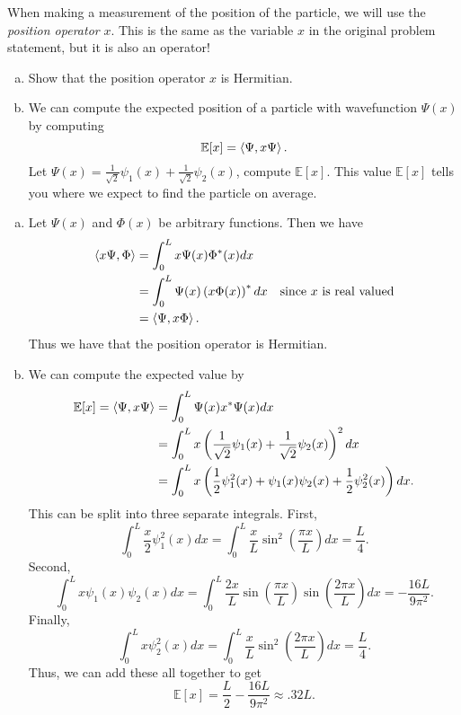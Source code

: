 \documentclass[12pt]{article} %
\begin{document}
\begin{problem}
  When making a measurement of the position of the particle, we will use the \emph{position operator} $x$.  This is the same as the variable $x$ in the original problem statement, but it is also an operator!
   \begin{enumerate}[(a)]
   		\item Show that the position operator $x$ is Hermitian.
   		\item We can compute the expected position of a particle with wavefunction $\Psi(x)$ by computing
   		\[
   		\mathbb{E}[x]=\left\langle \Psi, x\Psi \right\rangle.
   		\]
   		Let $\Psi(x) = \frac{1}{\sqrt{2}} \psi_1(x) + \frac{1}{\sqrt{2}} \psi_2(x)$, compute $\mathbb{E}[x]$. This value $\mathbb{E}[x]$ tells you where we expect to find the particle on average.
   	\end{enumerate}
\end{problem}
\begin{solution}
	\begin{enumerate}[(a)]
		\item Let $\Psi(x)$ and $\Phi(x)$ be arbitrary functions.  Then we have
		\begin{align*}
			\left\langle x\Psi, \Phi \right\rangle &= \int_0^L x \Psi(x)\Phi^*(x)dx\\
			&= \int_0^L \Psi(x) \left(x \Phi(x)\right)^*dx &\textrm{since $x$ is real valued}\\
			&= \left\langle \Psi, x\Phi \right\rangle.
		\end{align*}
		Thus we have that the position operator is Hermitian.
		\item We can compute the expected value by
		\begin{align*}
			\mathbb{E}[x] = \left\langle \Psi, x\Psi \right\rangle &= \int_0^L \Psi(x) x^* \Psi(x)dx\\
			&= \int_0^L x\left(\frac{1}{\sqrt{2}}\psi_1(x)+\frac{1}{\sqrt{2}} \psi_2(x)\right)^2dx\\
			&= \int_0^L x \left(\frac{1}{2} \psi_1^2(x) + \psi_1(x)\psi_2(x) + \frac{1}{2} \psi_2^2(x)\right)dx.
		\end{align*}
		This can be split into three separate integrals. First,
		\[
		\int_0^L \frac{x}{2} \psi_1^2(x)dx = \int_0^L \frac{x}{L} \sin^2\left(\frac{\pi x}{L}\right)dx = \frac{L}{4}.
		\]
		Second,
		\[
		\int_0^L x \psi_1(x)\psi_2(x)dx = \int_0^L \frac{2x}{L} \sin\left(\frac{\pi x}{L}\right)\sin\left(\frac{2\pi x}{L}\right)dx = -\frac{16L}{9\pi^2}.
		\]
		Finally,
		\[
		\int_0^L x \psi_2^2(x)dx = \int_0^L \frac{x}{L} \sin^2\left(\frac{2\pi x}{L}\right)dx = \frac{L}{4}.
		\]
		Thus, we can add these all together to get
		\[
		\boxed{\mathbb{E}[x] = \frac{L}{2}-\frac{16L}{9\pi^2}\approx .32L}.
		\]
	\end{enumerate}
\end{solution}
\end{document}
